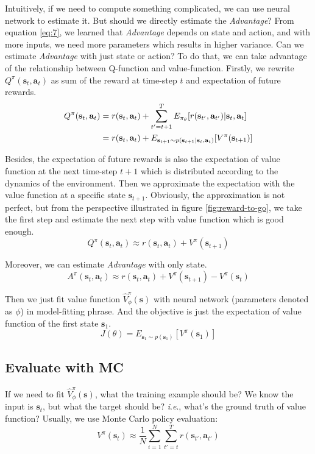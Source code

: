\documentclass{tufte-handout}
\newcommand{\ie}{\textit{i}.\textit{e}., }
\newcommand{\s}{\mathbf{s}}
\newcommand{\act}{\mathbf{a}}
\begin{document}
Intuitively, if we need to compute something complicated, we can use neural network to estimate it. But should we directly estimate the \emph{Advantage}?
From equation \ref{eq:7}, we learned that \emph{Advantage} depends on state and action, and with more inputs, we need more parameters which results in higher variance. Can we estimate \emph{Advantage} with just state or action? To do that, we can take advantage of the relationship between Q-function and
value-function. Firstly, we rewrite $Q^\pi(\s_t, \act_t)$ as sum of the reward at time-step $t$ and expectation of future rewards.
\begin{align}
\label{eq:9}
Q^\pi(\s_t, \act_t) & = r(\s_t, \act_t) + \sum_{t'=t+1}^{T} E_{\pi_\theta} [ r(\s_{t'}, \act_{t'}) | \s_t, \act_t] \notag \\
& = r(\s_t, \act_t) + E_{\s_{t+1} \sim p(\s_{t+1} | \s_t, \act_t)} [ V^\pi (\s_{t+1})]
\end{align}

Besides, the expectation of future rewards is also the expectation of value function at the next time-step $t+1$ which is distributed according to the dynamics of the environment. Then we approximate the expectation with the value function at a specific state $\s_{t+1}$. Obviously, the approximation is not perfect, but from the perspective illustrated in figure \ref{fig:reward-to-go}, we take the first step and estimate the next step with value function which is good enough.
\begin{equation}
\label{eq:10}
Q^\pi(\s_t, \act_t) \approx r(\s_t, \act_t) +  V^\pi (\s_{t+1})
\end{equation}

Moreover, we can estimate \emph{Advantage} with only state.
\begin{equation}
\label{eq:11}
A^\pi(\s_t, \act_t) \approx r(\s_t, \act_t) +  V^\pi (\s_{t+1}) - V^\pi (\s_{t})
\end{equation}

Then we just fit value function $\hat{V} ^\pi _\phi (\s)$ with neural network (parameters denoted as $\phi$) in model-fitting phrase. And the objective is just the expectation of value function of the first state $\s_1$.
\begin{equation}
\label{eq:12}
J(\theta) = E_{\s_1 \sim p(\s_1)} [ V^\pi(\s_1)]
\end{equation}

\subsection{Evaluate with MC}
If we need to fit $\hat{V} ^\pi _\phi (\s)$, what the training example should be? We know the input is $\s_t$, but what the target should be? \ie what's the ground truth of value function? Usually, we use Monte Carlo policy evaluation:
\begin{equation}
\label{eq:13}
V^\pi(\s_t) \approx \frac{1}{N} \sum_{i=1} ^ N \sum_{t'=t}^T r(\s_{t'}, \act_{t'})
\end{equation}
\end{document}
